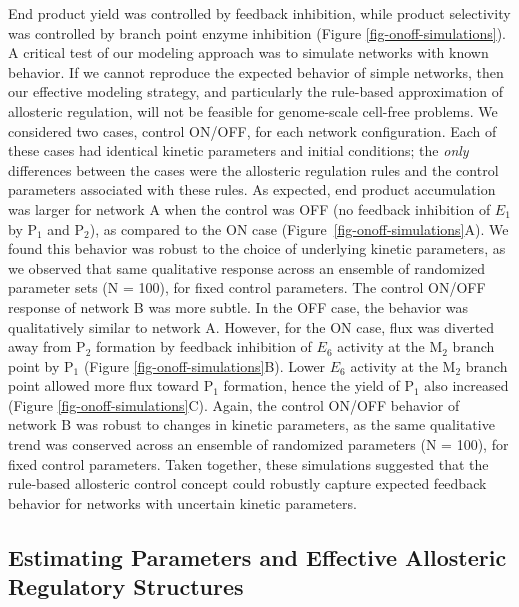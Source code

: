 \documentclass[processes,article,accept,moreauthors,pdftex,12pt,a4paper]{mdpi}
\begin{document}
End product yield was controlled by feedback inhibition, while product selectivity was controlled by branch point enzyme inhibition (Figure \ref{fig-onoff-simulations}). 
A critical test of our modeling approach was to simulate networks with known behavior. 
If we cannot reproduce the expected behavior of simple networks, then our effective modeling strategy, and particularly the rule-based approximation of allosteric regulation, will not be feasible for genome-scale cell-free problems. We considered two cases, control ON/OFF, for each network configuration. 
Each of these cases had identical kinetic parameters and initial conditions; the \textit{only} differences between the cases were the allosteric regulation rules and the control parameters associated with these rules. 
As expected, end product accumulation was larger for network A when the control was OFF (no feedback inhibition of $E_{1}$ by P$_{1}$ and P$_{2}$),
as compared to the ON case (Figure~\ref{fig-onoff-simulations}A). 
We found this behavior was robust to the choice of underlying kinetic parameters, as we observed that same qualitative response across an ensemble of randomized parameter sets (N = 100), for fixed control parameters. 
The control ON/OFF response of network B was more subtle. 
In the OFF case, the behavior was qualitatively similar to network A. 
However, for the ON case, flux was diverted away from P$_{2}$ formation by feedback inhibition of $E_{6}$ activity at the M$_{2}$ branch point by P$_{1}$ (Figure \ref{fig-onoff-simulations}B). 
Lower $E_{6}$ activity at the M$_{2}$ branch point allowed more flux toward P$_{1}$ formation, hence the yield of P$_{1}$ also increased (Figure \ref{fig-onoff-simulations}C). 
Again, the control ON/OFF behavior of network B was robust to changes in kinetic parameters, as the same qualitative trend was conserved across an ensemble of randomized parameters (N = 100), for fixed control parameters. 
Taken together, these simulations suggested that the rule-based allosteric control concept could robustly capture expected feedback behavior for networks with uncertain kinetic parameters. 

\subsection{Estimating Parameters and Effective Allosteric Regulatory Structures}
\end{document}
